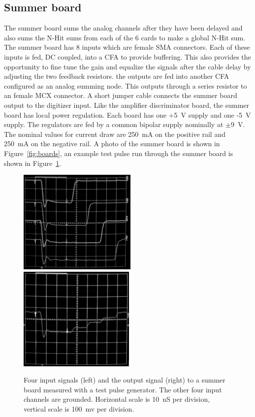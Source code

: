 \documentclass[review,number,sort&compress]{elsarticle}
\begin{document}
\subsection{Summer board}
\label{sec:Sum}
%
The summer board sums the analog channels after they have been
delayed and also sums the N-Hit sums from each of the 6 cards to make
a global N-Hit sum. The summer board has 8 inputs which are female
SMA connectors. Each of these inputs is fed, DC coupled, into a CFA
to provide buffering. This also provides the opportunity to fine tune
the gain and equalize the signals after the cable delay by adjusting
the two feedback resistors. the outputs are fed into another CFA
configured as an analog summing node. This outputs through a series
resistor to an female MCX connector. A short jumper cable connects
the summer board output to the digitizer input. Like the amplifier
discriminator board, the summer board has local power regulation.
Each board has one +5~V supply and one -5~V supply. The regulators are
fed by a common bipolar supply nominally at $\pm$9~V.
The nominal values for current draw are 250~mA on the positive
rail and 250~mA on the negative rail. A photo of the summer
board is shown in Figure~\ref{fig:boards}, an example test pulse run
through the summer board is shown in Figure~\ref{fig:summerpulse}.

\begin{figure}[ht]
	\begin{center}
		\includegraphics[height=2in, keepaspectratio=true]{graphics/sumpulseinput_bw.png}
		\includegraphics[height=2in, keepaspectratio=true]{graphics/sumpulseoutput_bw.png}
		\caption{Four input signals (left) and the output signal (right) to a summer board measured with a test pulse generator.
			The other four input channels are grounded. Horizontal scale is 10~nS per division, vertical scale is 100~mv per division.
		\label{fig:summerpulse}}
	\end{center}
\end{figure}
\end{document}
